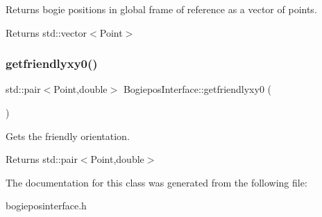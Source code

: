Returns bogie positions in global frame of reference as a vector of points. 

\begin{DoxyReturn}{Returns}
std\+::vector$<$\+Point$>$ 
\end{DoxyReturn}
\mbox{\label{classBogieposInterface_a730cb8dcbd3c42a19b6f6350ec1e3999}} 
\subsubsection{\texorpdfstring{getfriendlyxy0()}{getfriendlyxy0()}}
{\footnotesize\ttfamily std\+::pair$<$Point,double$>$ Bogiepos\+Interface\+::getfriendlyxy0 (\begin{DoxyParamCaption}{ }\end{DoxyParamCaption})}



Gets the friendly orientation. 

\begin{DoxyReturn}{Returns}
std\+::pair$<$\+Point,double$>$ 
\end{DoxyReturn}


The documentation for this class was generated from the following file\+:\begin{DoxyCompactItemize}
\item 
bogieposinterface.\+h\end{DoxyCompactItemize}
